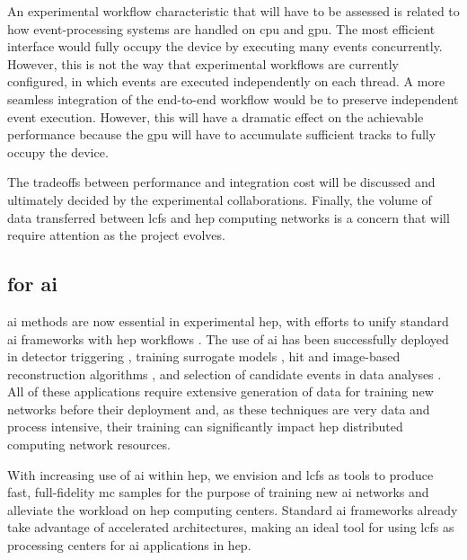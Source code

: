 An experimental workflow characteristic that will have to be assessed is related
to how event-processing systems are handled on \ac{cpu} and \ac{gpu}. The most
efficient interface would fully occupy the device by executing many events
concurrently.  However, this is not the way that experimental workflows are
currently configured, in which events are executed independently on each thread.
A more seamless integration of the end-to-end workflow would be to preserve
independent event execution.  However, this will have a dramatic effect on the
achievable performance because the \ac{gpu} will have to accumulate sufficient
tracks to fully occupy the device.

The tradeoffs between performance and integration cost will be discussed and
ultimately decided by the experimental collaborations. Finally, the volume of
data transferred between \acp{lcf} and \ac{hep} computing networks is a concern
that will require attention as the project evolves.

\subsection{\celeritas for \ac{ai}}
\label{sec:celeritas-ai}

\ac{ai} methods are now essential in experimental \ac{hep}, with efforts to
unify standard \ac{ai} frameworks with \ac{hep} workflows \cite{mlaas4hep}. The
use of \ac{ai} has been successfully deployed in detector triggering
\cite{ml-trigger}, training surrogate models \cite{fastcalogan}, hit and
image-based reconstruction algorithms \cite{gnn-reco-cms,jets-deep-learning},
and selection of candidate events in data analyses \cite{cvn-nova}. All of these
applications require extensive generation of data for training new networks
before their deployment and, as these techniques are very data and process
intensive, their training can significantly impact \ac{hep} distributed
computing network resources.

With increasing use of \ac{ai} within \ac{hep}, we envision \celeritas and
\acp{lcf} as tools to produce fast, full-fidelity \ac{mc} samples for the
purpose of training new \ac{ai} networks and alleviate the workload on \ac{hep}
computing centers. Standard \ac{ai} frameworks already take advantage of
accelerated architectures, making \celeritas an ideal tool for using \acp{lcf}
as processing centers for \ac{ai} applications in \ac{hep}.

